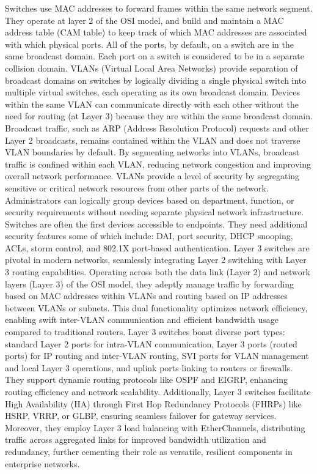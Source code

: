 \documentclass{article}
\begin{document}
	Switches use MAC addresses to forward frames within the same network segment. They operate at layer 2 of the OSI model, and build and maintain a MAC address table (CAM table) to keep track of which MAC addresses are associated with which physical ports. All of the ports, by default, on a switch are in the same broadcast domain. Each port on a switch is considered to be in a separate collision domain. VLANs (Virtual Local Area Networks) provide separation of broadcast domains on switches by logically dividing a single physical switch into multiple virtual switches, each operating as its own broadcast domain. Devices within the same VLAN can communicate directly with each other without the need for routing (at Layer 3) because they are within the same broadcast domain. Broadcast traffic, such as ARP (Address Resolution Protocol) requests and other Layer 2 broadcasts, remains contained within the VLAN and does not traverse VLAN boundaries by default. By segmenting networks into VLANs, broadcast traffic is confined within each VLAN, reducing network congestion and improving overall network performance. VLANs provide a level of security by segregating sensitive or critical network resources from other parts of the network. Administrators can logically group devices based on department, function, or security requirements without needing separate physical network infrastructure. Switches are often the first devices accessible to endpoints. They need additional security features some of which include: DAI, port security, DHCP snooping, ACLs, storm control, and 802.1X port-based authentication. Layer 3 switches are pivotal in modern networks, seamlessly integrating Layer 2 switching with Layer 3 routing capabilities. Operating across both the data link (Layer 2) and network layers (Layer 3) of the OSI model, they adeptly manage traffic by forwarding based on MAC addresses within VLANs and routing based on IP addresses between VLANs or subnets. This dual functionality optimizes network efficiency, enabling swift inter-VLAN communication and efficient bandwidth usage compared to traditional routers. Layer 3 switches boast diverse port types: standard Layer 2 ports for intra-VLAN communication, Layer 3 ports (routed ports) for IP routing and inter-VLAN routing, SVI ports for VLAN management and local Layer 3 operations, and uplink ports linking to routers or firewalls. They support dynamic routing protocols like OSPF and EIGRP, enhancing routing efficiency and network scalability. Additionally, Layer 3 switches facilitate High Availability (HA) through First Hop Redundancy Protocols (FHRPs) like HSRP, VRRP, or GLBP, ensuring seamless failover for gateway services. Moreover, they employ Layer 3 load balancing with EtherChannels, distributing traffic across aggregated links for improved bandwidth utilization and redundancy, further cementing their role as versatile, resilient components in enterprise networks.\\
\end{document}
